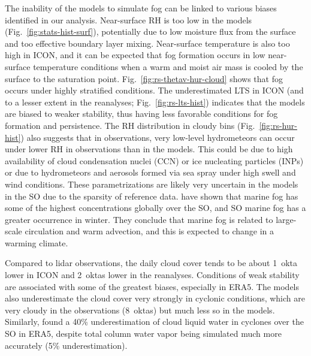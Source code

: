 \documentclass[draft]{agujournal2019}
\begin{document}
The inability of the models to simulate fog can be linked to various biases identified in our analysis. Near-surface RH is too low in the models (Fig.~\ref{fig:stats-hist-surf}), potentially due to low moisture flux from the surface and too effective boundary layer mixing. Near-surface temperature is also too high in ICON, and it can be expected that fog formation occurs in low near-surface temperature conditions when a warm and moist air mass is cooled by the surface to the saturation point. Fig.~\ref{fig:rs-thetav-hur-cloud} shows that fog occurs under highly stratified conditions. The underestimated LTS in ICON (and to a lesser extent in the reanalyses; Fig.~\ref{fig:rs-lts-hist}) indicates that the models are biased to weaker stability, thus having less favorable conditions for fog formation and persistence. The RH distribution in cloudy bins (Fig.~\ref{fig:rs-hur-hist}) also suggests that in observations, very low-level hydrometeors can occur under lower RH in observations than in the models. This could be due to high availability of cloud condensation nuclei (CCN) or ice nucleating particles (INPs) or due to hydrometeors and aerosols formed via sea spray under high swell and wind conditions. These parametrizations are likely very uncertain in the models in the SO due to the sparsity of reference data.  have shown that marine fog has some of the highest concentrations globally over the SO, and SO marine fog has a greater occurrence in winter. They conclude that marine fog is related to large-scale circulation and warm advection, and this is expected to change in a warming climate.

Compared to lidar observations, the daily cloud cover tends to be about 1~okta lower in ICON and 2~oktas lower in the reanalyses. Conditions of weak stability are associated with some of the greatest biases, especially in ERA5. The models also underestimate the cloud cover very strongly in cyclonic conditions, which are very cloudy in the observations (8~oktas) but much less so in the models. Similarly,  found a 40\% underestimation of cloud liquid water in cyclones over the SO in ERA5, despite total column water vapor being simulated much more accurately (5\% underestimation).
\end{document}
